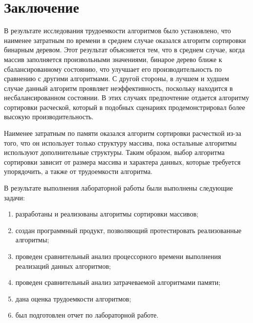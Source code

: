 \chapter*{Заключение}

В результате исследования трудоемкости алгоритмов было установлено, что наименее затратным по времени в среднем случае оказался алгоритм сортировки бинарным деревом. 
Этот результат объясняется тем, что в среднем случае, когда массив заполняется произвольными значениями, бинарое дерево ближе к сбалансированному состоянию, что улучшает его производительность по сравнению с другими алгоритмами.
С другой стороны, в лучшем и худшем случае данный алгоритм проявляет неэффективность, поскольку находится в несбалансированном состоянии. 
В этих случаях предпочтение отдается алгоритму сортировки расческой, который в подобных сценариях продемонстрировал более высокую производительность.

Наименее затратным по памяти оказался алгоритм сортировки расчесткой из-за того, что он использует только структуру массива, пока остальные алгоритмы используют дополнительные структуры.
Таким образом, выбор алгоритма сортировки зависит от размера массива и характера данных, которые требуется упорядочить, а также от трудоемкости алгоритма.

В результате выполнения лабораторной работы были выполнены следующие задачи: 
\begin{enumerate}[label={\arabic*)}]
	\item разработаны и реализованы алгоритмы сортировки массивов;
	\item создан программный продукт, позволяющий протестировать реализованные алгоритмы;
	\item проведен сравнительный анализ процессорного времени выполнения реализаций данных алгоритмов;
	\item проведен сравнительный анализ затрачеваемой алгоритмами памяти;
	\item дана оценка трудоемкости алгоритмов;
	\item был подготовлен отчет по лабораторной работе.
\end{enumerate}